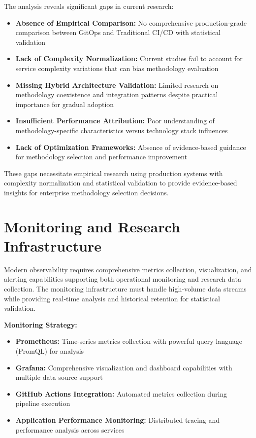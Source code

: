 The analysis reveals significant gaps in current research:

\begin{itemize}
\item \textbf{Absence of Empirical Comparison:} No comprehensive production-grade comparison between GitOps and Traditional CI/CD with statistical validation
\item \textbf{Lack of Complexity Normalization:} Current studies fail to account for service complexity variations that can bias methodology evaluation
\item \textbf{Missing Hybrid Architecture Validation:} Limited research on methodology coexistence and integration patterns despite practical importance for gradual adoption
\item \textbf{Insufficient Performance Attribution:} Poor understanding of methodology-specific characteristics versus technology stack influences
\item \textbf{Lack of Optimization Frameworks:} Absence of evidence-based guidance for methodology selection and performance improvement
\end{itemize}

These gaps necessitate empirical research using production systems with complexity normalization and statistical validation to provide evidence-based insights for enterprise methodology selection decisions.

\section{Monitoring and Research Infrastructure}

Modern observability requires comprehensive metrics collection, visualization, and alerting capabilities supporting both operational monitoring and research data collection. The monitoring infrastructure must handle high-volume data streams while providing real-time analysis and historical retention for statistical validation.

\textbf{Monitoring Strategy:}
\begin{itemize}
\item \textbf{Prometheus:} Time-series metrics collection with powerful query language (PromQL) for analysis
\item \textbf{Grafana:} Comprehensive visualization and dashboard capabilities with multiple data source support
\item \textbf{GitHub Actions Integration:} Automated metrics collection during pipeline execution
\item \textbf{Application Performance Monitoring:} Distributed tracing and performance analysis across services
\end{itemize}

